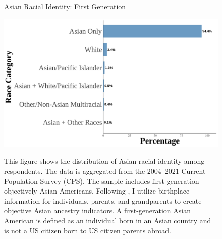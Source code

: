\newpage
\pagebreak

\begin{center}
\begin{figure}[H]
\caption{Asian Racial Identity: First Generation}
\includegraphics[width=\textwidth]{histogram_asian_american_race_firstgen.png} 
\label{fig:histogram-firstgen}
\caption*{\footnotesize{This figure shows the distribution of Asian racial identity among respondents. 
The data is aggregated from the 2004--2021 Current Population Survey (CPS). 
The sample includes first-generation objectively Asian Americans.
Following \textcite{antmanEthnicAttritionObserved2016,antmanEthnicAttritionAssimilation2020}, 
I utilize birthplace information for individuals, parents, and grandparents to create objective Asian ancestry indicators.
A first-generation Asian American is defined as an individual born in an Asian country and is not a US citizen born to US citizen parents abroad.
}}
\end{figure}
\end{center}


\pagebreak
\newpage


